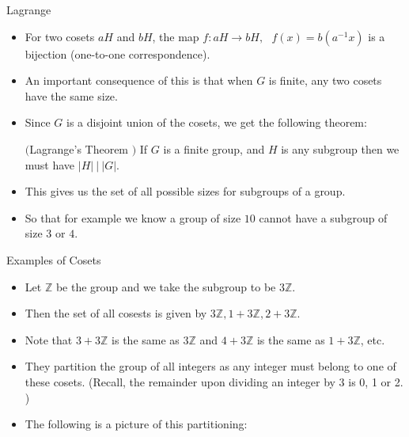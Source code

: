 \documentclass[ %
 10pt, xcolor={dvipsnames,svgnames,x11names,hyperref},
   hyperref={colorlinks=true,citecolor=green,linkcolor=DarkRed,urlcolor=ProcessBlue,anchorcolor=blue}
  ]{beamer}
\newenvironment{stepitemize}{\begin{itemize}[<+->]}{\end{itemize} }
\newcommand{\Z}{\mathbb{Z}}
\begin{document}
\begin{frame}{Lagrange}
\begin{stepitemize}
    \item For two cosets $aH$ and $bH$, the map
    $f:aH\rightarrow bH, \:\:\: f(x) = b(a^{-1}x)$
is a bijection (one-to-one correspondence).

    \item An important consequence of this is that when $G$ is finite, any two cosets have the same size.
    \item Since $G$ is a disjoint union of the cosets, we get the following theorem:
\begin{theorem}$($Lagrange's Theorem $)$
If $G$ is a finite group, and $H$ is any subgroup then we must have $|H| \: | \: |G|$.
\end{theorem}
\item This gives us the set of all possible sizes for subgroups of a group.
\item So that for example we know a group of size $10$ cannot have a subgroup of size $3$ or $4$.
\end{stepitemize}

\end{frame}

\begin{frame}{Examples of Cosets}
    \begin{stepitemize}
        \item Let $\Z$ be the group and we take the subgroup to be $3\Z$.
        \item Then the set of all cosests is given by
    $3\Z, 1+3\Z, 2+3\Z$.
    \item Note that $3+3\Z$ is the same as $3\Z$ and $4+3\Z$ is the same as $1+3\Z$, etc.
    \item They partition the group of all integers as any integer must belong to one of these cosets. (Recall, the remainder upon dividing an integer by 3 is 0, 1 or 2. )
    \item The following is a picture of this partitioning:

    \bigskip


    \end{stepitemize}
\end{frame}
\end{document}
